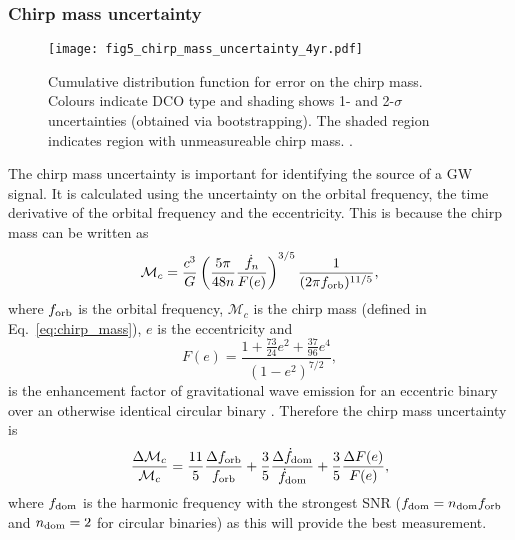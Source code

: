 \subsubsection{Chirp mass uncertainty}

\begin{figure}[tb]
    \centering
    \texttt{[image: fig5\_chirp\_mass\_uncertainty\_4yr.pdf]}
    \caption{Cumulative distribution function for error on the chirp mass. Colours indicate DCO type and shading shows 1- and 2-$\sigma$ uncertainties (obtained via bootstrapping). The shaded region indicates region with unmeasureable chirp mass. \href{https://github.com/TomWagg/detecting-DCOs-in-LISA/blob/main/paper/figures/fig5_chirp_mass_uncertainty_4yr.png}{\faFileImage} \href{https://github.com/TomWagg/detecting-DCOs-in-LISA/blob/main/paper/figure_notebooks/fiducial.ipynb}{\faBook}.}
    \label{fig:m_c_unc}
\end{figure}

The chirp mass uncertainty is important for identifying the source of a GW signal. It is calculated using the uncertainty on the orbital frequency, the time derivative of the orbital frequency and the eccentricity. This is because the chirp mass can be written as
\begin{equation}
    \mathcal{M}_c = \frac{c^3}{G} \left( \frac{5 \pi}{48 n} \frac{\dot{f}_{n}}{F(e)} \right)^{3/5} \frac{1}{(2 \pi f_{\rm orb})^{11/5}},
\end{equation}
where $f_{\rm orb}$ is the orbital frequency, $\mathcal{M}_{c}$ is the chirp mass (defined in Eq.~\ref{eq:chirp_mass}), $e$ is the eccentricity and
\begin{equation}
    F(e) = \frac{1 + \frac{73}{24} e^2 + \frac{37}{96} e^4}{(1 - e^2)^{7/2}},
\end{equation}
is the enhancement factor of gravitational wave emission for an eccentric binary over an otherwise identical circular binary \citep[][Eq.~17]{Peters+1963}. Therefore the chirp mass uncertainty is
\begin{equation}\label{eq:chirp_mass_uncertainty}
    \frac{\Delta \mathcal{M}_c}{\mathcal{M}_c} = \frac{11}{5} \frac{\Delta f_{\rm orb}}{f_{\rm orb}} + \frac{3}{5} \frac{\Delta \dot{f}_{\rm dom}}{\dot{f}_{\rm dom}} + \frac{3}{5} \frac{\Delta F(e)}{F(e)},
\end{equation}
where $f_{\rm dom}$ is the harmonic frequency with the strongest SNR ($f_{\rm dom} = n_{\rm dom} f_{\rm orb}$ and $n_{\rm dom} = 2$ for circular binaries) as this will provide the best measurement.

